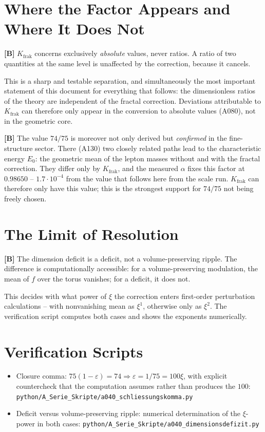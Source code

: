 \section{Where the Factor Appears and Where It Does Not}

\textbf{[B]} $K_\text{frak}$ concerns exclusively \emph{absolute} values, never
ratios. A ratio of two quantities at the same level is unaffected by the
correction, because it cancels.

This is a sharp and testable separation, and simultaneously the most important
statement of this document for everything that follows: the dimensionless ratios
of the theory are independent of the fractal correction. Deviations attributable
to $K_\text{frak}$ can therefore only appear in the conversion to absolute values
(A080), not in the geometric core.

\textbf{[B]} The value $74/75$ is moreover not only derived but
\emph{confirmed} in the fine-structure sector. There (A130) two closely related
paths lead to the characteristic energy $E_0$: the geometric mean of the lepton
masses without and with the fractal correction. They differ only by
$K_\text{frak}$, and the measured $\alpha$ fixes this factor at $0{.}98650$ --
$1{.}7\cdot10^{-4}$ from the value that follows here from the scale run.
$K_\text{frak}$ can therefore only have this value; this is the strongest
support for $74/75$ not being freely chosen.

\section{The Limit of Resolution}

\textbf{[B]} The dimension deficit is a deficit, not a volume-preserving
ripple. The difference is computationally accessible: for a volume-preserving
modulation, the mean of $f$ over the torus vanishes; for a deficit, it does not.

This decides with what power of $\xi$ the correction enters first-order
perturbation calculations -- with nonvanishing mean as $\xi^1$, otherwise only
as $\xi^2$. The verification script computes both cases and shows the exponents
numerically.

\section{Verification Scripts}

\begin{itemize}
  \item Closure comma: $75(1-\varepsilon)=74 \Rightarrow \varepsilon = 1/75 = 100\xi$,
    with explicit countercheck that the computation assumes rather than produces
    the $100$:
    \texttt{python/A\_Serie\_Skripte/a040\_schliessungskomma.py}
  \item Deficit versus volume-preserving ripple: numerical determination of
    the $\xi$-power in both cases:
    \texttt{python/A\_Serie\_Skripte/a040\_dimensionsdefizit.py}
\end{itemize}

